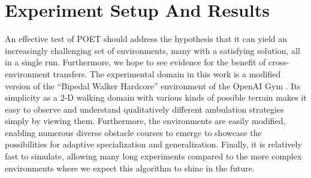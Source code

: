 \documentclass{article}
\newcommand{\jc}[1]{\comments{\textcolor{deepForestGreen}{[JC: #1]}}}
\newcommand{\jl}[1]{\comments{\textcolor{magenta}{[Joel: #1]}}}
\newcommand{\ks}[1]{\comments{\textcolor{purple}{[Ken: #1]}}}
\newcommand{\comments}[1]{#1}
\begin{document}


\section{Experiment Setup And Results} \label{experiments} %


An effective test of POET should address the hypothesis that it can yield an increasingly challenging set of environments, many with a satisfying solution, all in a single run.  Furthermore, we hope to see evidence for the benefit of cross-environment transfers.  The experimental domain in this work is a modified version of the ``Bipedal Walker Hardcore'' environment of the OpenAI Gym \cite{brockman}.  Its simplicity as a 2-D walking domain with various kinds of possible terrain makes it easy to observe and understand qualitatively different ambulation strategies  simply by viewing them.  Furthermore, the environments are easily modified, enabling numerous diverse obstacle courses to emerge to showcase the possibilities for adaptive specialization and generalization. Finally, it is relatively fast to simulate, allowing many long experiments compared to the more complex environments where we expect this algorithm to shine in the future.
\end{document}

